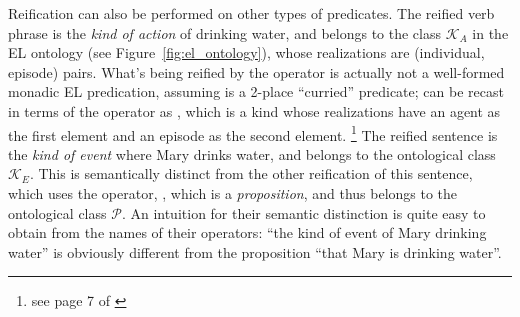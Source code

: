 Reification can also be performed on other types of predicates. The reified verb phrase 
is the \textit{kind of action} of drinking water, and belongs to the class $\mathcal{K}_{A}$ in the EL ontology (see Figure~\ref{fig:el_ontology}), whose realizations are (individual, episode) pairs.
What's being reified by the  operator is actually not a well-formed monadic EL predication, assuming  is a 2-place ``curried'' predicate;  can be recast in terms of the  operator as , which is a kind whose realizations  have an agent as the first element and an episode as the second element. \footnote{see page 7 of \citep{schubert2000episodic}}
The reified sentence  is the \textit{kind of event} where Mary drinks water, and belongs to the ontological class $\mathcal{K}_{E}$. This is semantically distinct from the other reification of this sentence, which uses the  operator, , which is a \textit{proposition}, and thus belongs to the ontological class $\mathcal{P}$. An intuition for their semantic distinction is quite easy to obtain from the names of their operators: ``the kind of event of Mary drinking water'' is obviously different from the proposition ``that Mary is drinking water''.

